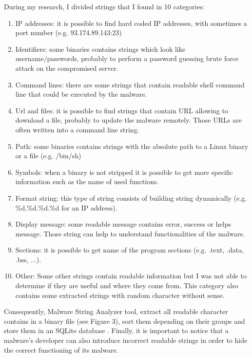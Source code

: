 During my research, I divided strings that I found in 10 categories:
\begin{enumerate}[label=\arabic*.]
  \item IP addresses: it is possible to find hard coded IP addresses, with sometimes a port
  number (e.g. 93.174.89.143:23)
  \item Identifiers: some binaries contains strings which look like username/passwords,
  probably to perform a password guessing brute force attack on the compromised server.
  \item Command lines:  there are some strings that contain readable shell command line
  that could be executed by the malware.
  \item Url and files: it is possible to find strings that contain URL allowing to download
  a file, probably to update the malware remotely. Those URLs are often written into a command line string.
  \item Path: some binaries contains strings with the absolute path to a Linux binary or a
  file (e.g. /bin/sh)
  \item Symbols: when a binary is not stripped it is possible to get more specific
  information such as the name of used functions.
  \item Format string: this type of string consists of building string dynamically
  (e.g. \%d.\%d.\%d.\%d for an IP address). 
  \item Display message: some readable message contains error, success or helps message.
  Those string can help to understand functionalities of the malware.
  \item Sections: it is possible to get name of the program sections (e.g. .text, .data,
  .bss, ...).
  \item Other: Some other strings contain readable information but I was not able to 
  determine if they are useful and where they come from. This category also contains 
  some extracted strings with random character without sense.
\end{enumerate}

Consequently, Malware String Analyzer tool, extract all readable character contains in a binary
file (see Figure 3), sort them depending on their groups and store them in an SQLite database \cite{sqlite}.
Finally, it is important to notice that a malware's developer can also introduce incorrect
readable strings in order to hide the correct functioning of its malware.


